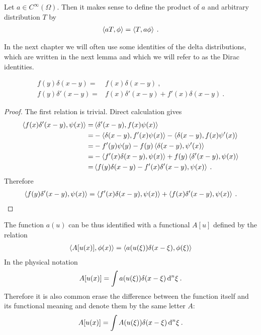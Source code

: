 Let $a \in C^\infty(\Omega)$. Then it makes sense to define the product of $a$ and arbitrary distribution $T$ by
\begin{align}
    \left \langle a T ,\phi \right \rangle = \left \langle T ,a \phi \right \rangle \:.
\end{align}

In the next chapter we will often use some identities of the delta distributions, which are written in the next lemma and which we will refer to as the Dirac identities.

\begin{lemma} \label{lemma:delta}
    \begin{align}
        f(y) \delta (x-y) =& f(x) \delta(x-y) \:, \\
        f(y) \delta'(x-y) =& f(x) \delta'(x-y) + f'(x) \delta(x-y) \:.
    \end{align}
\end{lemma}
\begin{proof}
    The first relation is trivial.
    Direct calculation gives
    \begin{align*}
        \left \langle f(x) \delta'(x-y) ,\psi(x) \right \rangle 
        =& \left \langle \delta'(x-y) ,f(x) \psi(x) \right \rangle 
         \\ =& -\left \langle \delta(x-y) ,f'(x)\psi(x) \right \rangle - \left \langle \delta(x-y) ,f(x)\psi'(x) \right \rangle 
         \\ =& -f'(y) \psi(y) - f(y) \left \langle \delta(x-y) ,\psi'(x) \right \rangle 
         \\ =& - \left \langle f'(x)  \delta(x-y) ,\psi(x) \right \rangle + f(y) \left \langle \delta'(x-y) ,\psi(x) \right \rangle 
         \\ =& \left \langle f(y) \delta(x-y) - f'(x) \delta'(x-y) ,\psi(x) \right \rangle \:.
    \end{align*}
    Therefore
    \begin{align}
        \left \langle f(y) \delta'(x-y) ,\psi(x) \right \rangle = \left \langle f'(x) \delta(x-y) ,\psi(x) \right \rangle + \left \langle f(x) \delta'(x-y) ,\psi(x) \right \rangle \:.
    \end{align} 
\end{proof}


The function $a(u)$ can be thus identified with a functional $A[u]$ defined by the relation
\begin{align}
    \left \langle A[u(x)] ,\phi(x) \right \rangle  = \left \langle a(u(\xi)) \delta(x-\xi) ,\phi(\xi) \right \rangle
\end{align}
In the physical notation
\begin{align}
    A[u(x)] = \int a(u(\xi)) \delta(x-\xi) \, \mathrm{d}^n \xi \:.
\end{align}
Therefore it is also common erase the difference between the function itself and its functional meaning and denote them by the same letter $A$:
\begin{align}
    A[u(x)] = \int A(u(\xi)) \delta(x-\xi) \, \mathrm{d}^n \xi \:.
\end{align}



